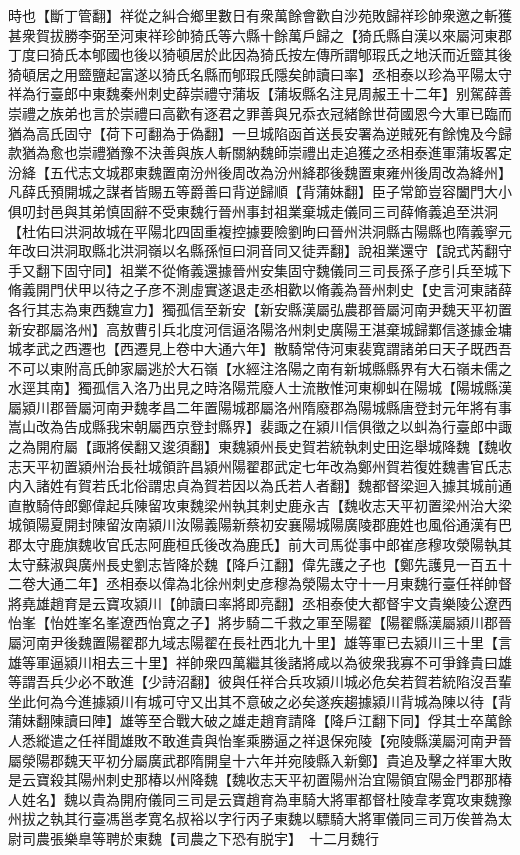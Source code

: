 時也【斷丁管翻】祥從之糾合鄉里數日有衆萬餘會歡自沙苑敗歸祥珍帥衆邀之斬獲甚衆賀拔勝李弼至河東祥珍帥猗氏等六縣十餘萬戶歸之【猗氏縣自漢以來屬河東郡丁度曰猗氏本郇國也後以猗頓居於此因為猗氏按左傳所謂郇瑕氏之地沃而近盬其後猗頓居之用盬鹽起富遂以猗氏名縣而郇瑕氏隱矣帥讀曰率】丞相泰以珍為平陽太守祥為行臺郎中東魏秦州刺史薛崇禮守蒲坂【蒲坂縣名注見周赧王十二年】别駕薛善崇禮之族弟也言於崇禮曰高歡有逐君之罪善與兄忝衣冠緒餘世荷國恩今大軍已臨而猶為高氏固守【荷下可翻為于偽翻】一旦城陷函首送長安署為逆賊死有餘愧及今歸款猶為愈也崇禮猶豫不決善與族人斬關納魏師崇禮出走追獲之丞相泰進軍蒲坂畧定汾絳【五代志文城郡東魏置南汾州後周改為汾州絳郡後魏置東雍州後周改為絳州】凡薛氏預開城之謀者皆賜五等爵善曰背逆歸順【背蒲妹翻】臣子常節豈容闔門大小俱叨封邑與其弟慎固辭不受東魏行晉州事封祖業棄城走儀同三司薛脩義追至洪洞【杜佑曰洪洞故城在平陽北四固重複控據要險劉昫曰晉州洪洞縣古陽縣也隋義寧元年改曰洪洞取縣北洪洞嶺以名縣孫恒曰洞音同又徒弄翻】說祖業還守【說式芮翻守手又翻下固守同】祖業不從脩義還據晉州安集固守魏儀同三司長孫子彦引兵至城下脩義開門伏甲以待之子彦不測虛實遂退走丞相歡以脩義為晉州刺史【史言河東諸薛各行其志為東西魏宣力】獨孤信至新安【新安縣漢屬弘農郡晉屬河南尹魏天平初置新安郡屬洛州】高敖曹引兵北度河信逼洛陽洛州刺史廣陽王湛棄城歸鄴信遂據金墉城孝武之西遷也【西遷見上卷中大通六年】散騎常侍河東裴寛謂諸弟曰天子既西吾不可以東附高氏帥家屬逃於大石嶺【水經注洛陽之南有新城縣縣界有大石嶺未儒之水逕其南】獨孤信入洛乃出見之時洛陽荒廢人士流散惟河東柳虯在陽城【陽城縣漢屬潁川郡晉屬河南尹魏孝昌二年置陽城郡屬洛州隋廢郡為陽城縣唐登封元年將有事嵩山改為告成縣我宋朝屬西京登封縣界】裴諏之在潁川信俱徵之以虯為行臺郎中諏之為開府屬【諏將侯翻又逡須翻】東魏潁州長史賀若統執刺史田迄舉城降魏【魏收志天平初置潁州治長社城領許昌潁州陽翟郡武定七年改為鄭州賀若復姓魏書官氏志内入諸姓有賀若氏北俗謂忠貞為賀若因以為氏若人者翻】魏都督梁迴入據其城前通直散騎侍郎鄭偉起兵陳留攻東魏梁州執其刺史鹿永吉【魏收志天平初置梁州治大梁城領陽夏開封陳留汝南潁川汝陽義陽新蔡初安襄陽城陽廣陵郡鹿姓也風俗通漢有巴郡太守鹿旗魏收官氏志阿鹿桓氏後改為鹿氏】前大司馬從事中郎崔彦穆攻滎陽執其太守蘇淑與廣州長史劉志皆降於魏【降戶江翻】偉先護之子也【鄭先護見一百五十二卷大通二年】丞相泰以偉為北徐州刺史彦穆為滎陽太守十一月東魏行臺任祥帥督將堯雄趙育是云寶攻潁川【帥讀曰率將即亮翻】丞相泰使大都督宇文貴樂陵公遼西怡峯【怡姓峯名峯遼西怡寛之子】將步騎二千救之軍至陽翟【陽翟縣漢屬潁川郡晉屬河南尹後魏置陽翟郡九域志陽翟在長社西北九十里】雄等軍已去潁川三十里【言雄等軍逼潁川相去三十里】祥帥衆四萬繼其後諸將咸以為彼衆我寡不可爭鋒貴曰雄等謂吾兵少必不敢進【少詩沼翻】彼與任祥合兵攻潁川城必危矣若賀若統陷沒吾輩坐此何為今進據潁川有城可守又出其不意破之必矣遂疾趨據潁川背城為陳以待【背蒲妹翻陳讀曰陣】雄等至合戰大破之雄走趙育請降【降戶江翻下同】俘其士卒萬餘人悉縱遣之任祥聞雄敗不敢進貴與怡峯乘勝逼之祥退保宛陵【宛陵縣漢屬河南尹晉屬滎陽郡魏天平初分屬廣武郡隋開皇十六年并宛陵縣入新鄭】貴追及擊之祥軍大敗是云寶殺其陽州刺史那椿以州降魏【魏收志天平初置陽州治宜陽領宜陽金門郡那椿人姓名】魏以貴為開府儀同三司是云寶趙育為車騎大將軍都督杜陵韋孝寛攻東魏豫州拔之執其行臺馮邕孝寛名叔裕以字行丙子東魏以驃騎大將軍儀同三司万俟普為太尉司農張樂臯等聘於東魏【司農之下恐有脱宇】　十二月魏行

